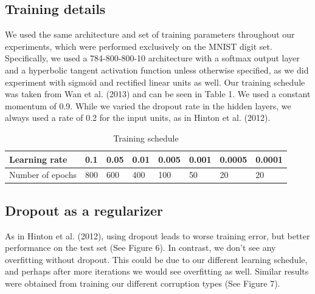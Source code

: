 \documentclass{article} %
\begin{document}
\subsection{Training details}
We used the same architecture and set of training parameters throughout our experiments, which were performed exclusively on the MNIST digit set. Specifically, we used a 784-800-800-10 architecture with a softmax output layer and a hyperbolic tangent activation function unless otherwise specified, as we did experiment with sigmoid and rectified linear units as well. Our training schedule was taken from Wan et al. (2013) and can be seen in Table 1. We used a constant momentum of 0.9. While we varied the dropout rate in the hidden layers, we always used a rate of 0.2 for the input units, as in Hinton et al. (2012).

\begin{table}[ht]
\caption{Training schedule}
\begin{center}
\begin{tabular}{| l |  l |  l  | l | l | l | l | l |}
\hline
Learning rate & 0.1 & 0.05 & 0.01 & 0.005 & 0.001 & 0.0005 & 0.0001 \\
\hline
Number of epochs & 800 & 600 & 400 & 100 & 50 & 20 & 20 \\
\hline
\end{tabular}
\end{center}
\end{table}

\subsection{Dropout as a regularizer}
As in Hinton et al. (2012), using dropout leads to worse training error, but better performance on the test set (See Figure 6). In contrast, we don't see any overfitting without dropout. This could be due to our different learning schedule, and perhaps after more iterations we would see overfitting as well. Similar results were obtained from training our different corruption types (See Figure 7).
\end{document}

